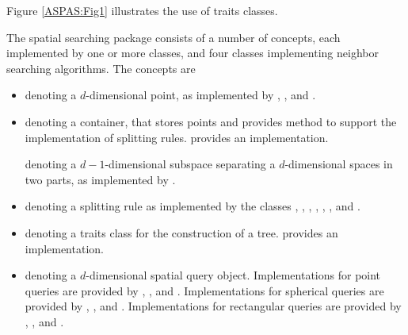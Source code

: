 \begin{ccTexOnly}
Figure \ref{ASPAS:Fig1} illustrates the use of traits classes.
\end{ccTexOnly}

The spatial searching package consists of a number of concepts, each implemented by
one or more classes, and four classes implementing neighbor 
searching algorithms. The concepts are

\begin{itemize}

\item 
{} 
denoting a $d$-dimensional point, as implemented by 
, , and .

\item
{} denoting a container, that stores points and
provides method to support the implementation of splitting rules. 
 provides an implementation.


 denoting a $d-1$-dimensional
subspace separating a $d$-dimensional spaces in two parts,
as implemented by .

\item 
{} denoting a splitting rule as implemented by the classes 
,
,
,
,
,
, and
.

\item
{} denoting a traits class for the construction of a tree.
 provides an implementation. 

\item
{} denoting a $d$-dimensional spatial query object. Implementations
for point queries are provided by
, , and .
Implementations
for spherical queries are provided by
, , and .
Implementations
for rectangular queries are provided by
, , and .


\end{itemize}
